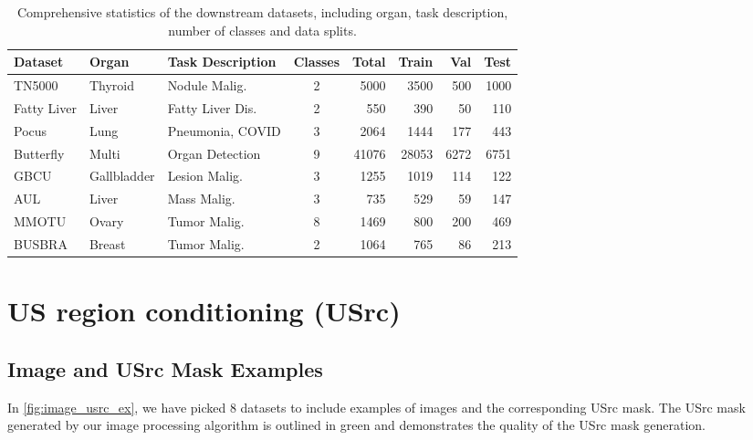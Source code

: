 \documentclass{article}
\theoremstyle{plain}
\theoremstyle{definition}
\theoremstyle{remark}
\begin{document}
\begin{table}[t]
  \caption{Comprehensive statistics of the downstream datasets, including organ, task description, number of classes and data splits.}
  \label{dataset-detailed-table}
  \begin{center}
    \begin{small}
      \begin{sc}
        \begin{tabular}{lllcrrrr}
          \toprule
          Dataset & Organ & Task Description & Classes & Total & Train & Val & Test \\
          \midrule
          TN5000      & Thyroid     & Nodule Malig. & 2 & 5000  & 3500  & 500  & 1000 \\
          Fatty Liver & Liver       & Fatty Liver Dis. & 2 & 550   & 390   & 50   & 110  \\
          Pocus       & Lung        & Pneumonia, COVID & 3 & 2064  & 1444  & 177  & 443  \\
          Butterfly   & Multi       & Organ Detection & 9 & 41076 & 28053 & 6272 & 6751 \\
          GBCU        & Gallbladder & Lesion Malig. & 3 & 1255  & 1019  & 114  & 122  \\
          AUL         & Liver    & Mass Malig. & 3 & 735   & 529   & 59   & 147  \\
          MMOTU       & Ovary       & Tumor Malig. & 8 & 1469  & 800   & 200  & 469  \\
          BUSBRA      & Breast      & Tumor Malig. & 2 & 1064  & 765   & 86   & 213  \\
          \bottomrule
        \end{tabular}
      \end{sc}
    \end{small}
  \end{center}
  \vskip -0.1in
\end{table}

\section{US region conditioning (USrc)}
\subsection{Image and USrc Mask Examples}\label{app:C.1}

In \cref{fig:image_usrc_ex}, we have picked 8 datasets to include examples of images and the corresponding USrc mask. The USrc mask generated by our image processing algorithm is outlined in green and demonstrates the quality of the USrc mask generation.
\end{document}
